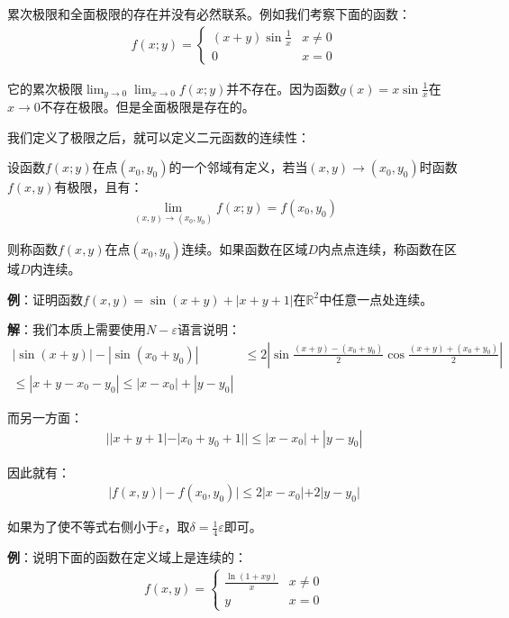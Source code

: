 \documentclass{ctexart}
\let\oldtextbf\textbf %
\renewcommand{\textbf}[1]{\textcolor{btex}{\oldtextbf{#1}}} %
\begin{document}
累次极限和全面极限的存在并没有必然联系。例如我们考察下面的函数：
\begin{align*}
    f(x;y)=\begin{cases}
        (x+y)\sin\frac{1}{x}& x\neq 0\\
        0 & x=0
    \end{cases}
\end{align*}

它的累次极限$\lim_{y\to 0}\lim_{x\to 0}f(x;y)$并不存在。因为函数$g(x)=x\sin \frac{1}{x}$在$x\to 0$不存在极限。但是全面极限是存在的。

我们定义了极限之后，就可以定义二元函数的连续性：
\begin{tcolorbox}[
    colback=bac2,     %
    colframe=fra2,   %
    coltitle=white,             %
    coltext=tex2,
    title=二元函数的连续性,
    fonttitle=\bfseries,        %
arc=3mm,                     %
breakable
]
设函数$f(x;y)$在点$(x_0,y_0)$的一个邻域有定义，若当$(x,y)\to(x_0,y_0)$时函数$f(x,y)$有极限，且有：
\begin{align*}
    \lim_{(x,y)\to(x_0,y_0)}f(x;y)=f(x_0,y_0)
\end{align*}

则称函数$f(x,y)$在点$(x_0,y_0)$连续。如果函数在区域$D$内点点连续，称函数在区域$D$内连续。
\end{tcolorbox}

\textbf{例}：证明函数$f(x,y)=\sin(x+y)+|x+y+1|$在$\mathbb{R}^2$中任意一点处连续。

\textbf{解}：我们本质上需要使用$N-\varepsilon$语言说明：
\begin{align*}
    |\sin(x+y)|-|\sin(x_0+y_0)|&\leq 2|\sin\frac{(x+y)-(x_0+y_0)}{2}\cos\frac{(x+y)+(x_0+y_0)}{2}|\\
    \leq|x+y-x_0-y_0|\leq|x-x_0|+|y-y_0|
\end{align*}

而另一方面：
\begin{align*}
    ||x+y+1|-|x_0+y_0+1||\leq |x-x_0|+|y-y_0|
\end{align*}

因此就有：
\begin{align*}
    |f(x,y)|-f(x_0,y_0)|\leq 2|x-x_0|+2|y-y_0|
\end{align*}

如果为了使不等式右侧小于$\varepsilon$，取$\delta=\frac{1}{4}\varepsilon$即可。

\textbf{例}：说明下面的函数在定义域上是连续的：
\begin{align*}
    f(x,y)=\begin{cases}
        \frac{\ln(1+xy)}{x} & x\neq 0\\
        y &x=0
    \end{cases}
\end{align*}
\end{document}
